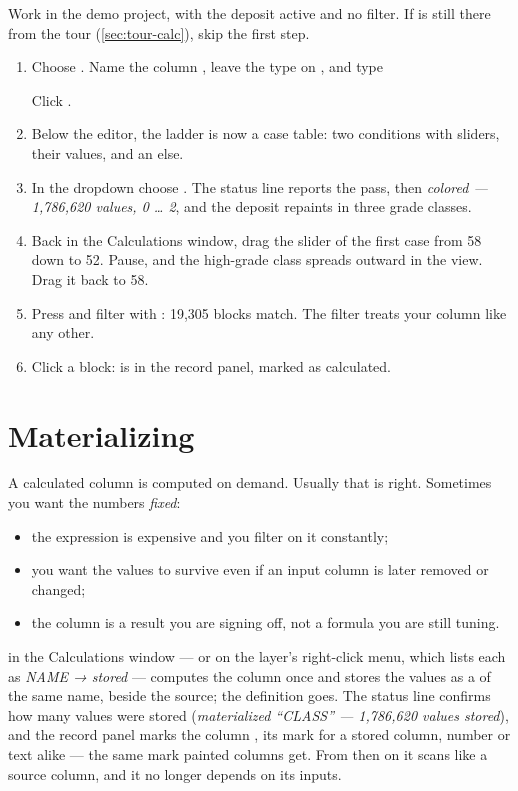 \begin{tryit}
Work in the demo project, with the deposit active and no filter. If  is still there from the tour (\cref{sec:tour-calc}), skip the first step.
\begin{enumerate}
\item Choose . Name the column , leave the type on , and type


Click .
\item Below the editor, the ladder is now a case table: two conditions with sliders, their values, and an else.
\item In the  dropdown choose . The status line reports the pass, then \emph{colored — 1,786,620 values, 0 … 2}, and the deposit repaints in three grade classes.
\item Back in the Calculations window, drag the slider of the first case from 58 down to 52. Pause, and the high-grade class spreads outward in the view. Drag it back to 58.
\item Press \key{/} and filter with : 19,305 blocks match. The filter treats your column like any other.
\item Click a block:  is in the record panel, marked as calculated.
\end{enumerate}
\end{tryit}

\section{Materializing}\label{sec:filter-materialize}
A calculated column is computed on demand. Usually that is right. Sometimes you want the numbers \emph{fixed}:

\begin{itemize}
\item the expression is expensive and you filter on it constantly;
\item you want the values to survive even if an input column is later removed or changed;
\item the column is a result you are signing off, not a formula you are still tuning.
\end{itemize}

 in the Calculations window — or  on the layer's right-click menu, which lists each  as \emph{NAME → stored} — computes the column once and stores the values as a  of the same name, beside the source; the  definition goes. The status line confirms how many values were stored (\emph{materialized “CLASS” — 1,786,620 values stored}), and the record panel marks the column , its mark for a stored column, number or text alike — the same mark painted columns get. From then on it scans like a source column, and it no longer depends on its inputs.

